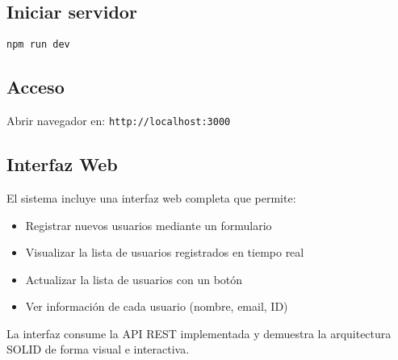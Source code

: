 \documentclass[11pt,a4paper]{article}
\begin{document}
\subsection*{Iniciar servidor}
\begin{verbatim}
npm run dev
\end{verbatim}

\subsection*{Acceso}
Abrir navegador en: \texttt{http://localhost:3000}

\subsection*{Interfaz Web}

El sistema incluye una interfaz web completa que permite:

\begin{itemize}
    \item Registrar nuevos usuarios mediante un formulario
    \item Visualizar la lista de usuarios registrados en tiempo real
    \item Actualizar la lista de usuarios con un botón
    \item Ver información de cada usuario (nombre, email, ID)
\end{itemize}

La interfaz consume la API REST implementada y demuestra la arquitectura SOLID de forma visual e interactiva.
\end{document}
